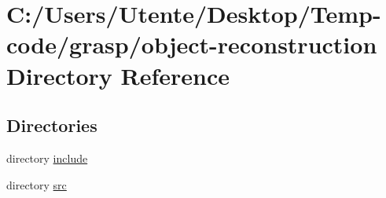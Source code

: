 \section{C\+:/\+Users/\+Utente/\+Desktop/\+Temp-\/code/grasp/object-\/reconstruction Directory Reference}
\label{dir_b6b14d461d04ca99581083da7a586455}
\subsection*{Directories}
\begin{DoxyCompactItemize}
\item 
directory \hyperlink{dir_5918a3f2ef113971a1c4f7ee06ed35a4}{include}
\item 
directory \hyperlink{dir_d66a79fe53ea9cc766b7a9ad445c352f}{src}
\end{DoxyCompactItemize}
